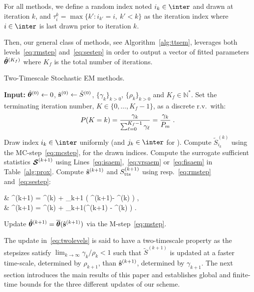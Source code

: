 \documentclass[12pt]{article}
\begin{document}
\medskip
{} For all methods, we define a random index noted $i_k \in \inter$ and drawn at iteration $k$, and $\tau_i^k = \max \{ k' : i_{k'} = i,~k' < k \}$ as the iteration index where $i \in \inter$ is last drawn prior to iteration $k$.



Then, our general class of methods, see Algorithm~\ref{alg:ttsem}, leverages both levels~\eqref{eq:rmstep} and~\eqref{eq:sestep} in order to output a vector of fitted parameters $\hat{{\bm{\theta}}}^{({ K}_{ f })}$ where ${ K}_{ f }$ is the total number of iterations.
\begin{algorithm}[t]
\caption{Two-Timescale Stochastic EM methods.}\label{alg:ttsem}
  \begin{algorithmic}[1]
  \STATE \textbf{Input:} $\hat{{\bm{\theta}}}^{(0)} \leftarrow 0$, $\hat{{\mathbf{s}}}^{(0)} \leftarrow \tilde{S}^{(0)}$, $\{\gamma_k\}_{k>0}$, $\{\rho_k\}_{k>0}$ and $ { K}_{ f }\in \mathbb{N}^*$.
  \STATE Set the terminating iteration number, $K \in \{0,\dots,{ K}_{ f }-1\}$, as a discrete r.v.~with:
  \begin{equation} \label{eq:random}
   P( K = k ) = \frac{ \gamma_{k} }{\sum_{\ell=0}^{{ K}_{ f }-1} \gamma_\ell} = \frac{\gamma_k}{{ P}_{ m}}\;.
  \end{equation}
  \STATE Draw index $i_k \in \inter$ uniformly (and $j_k \in \inter$ for \FISAEM).
     \STATE Compute $\tilde{S}_{i_k}^{(k)}$ using the { MC-step}~\eqref{eq:mcstep},  for the drawn indices.
   \STATE Compute the surrogate sufficient statistics ${\bm{\mathcal{S}}}^{(k+1)}$ using Lines~\ref{eq:isaem},~\ref{eq:vrsaem} or~\ref{eq:fisaem} in Table~\ref{alg:prox}.
   \STATE Compute $\hat{{\mathbf{s}}}^{(k+1)}$ and $S_{\textrm{tts}}^{(k+1)}$ using resp.~\eqref{eq:rmstep} and~\eqref{eq:sestep}:
\beq \label{eq:twolevels}
\begin{split}
& \stt^{(k+1)} = \stt^{(k)} + \rho_{k+1} ( \StocEstep^{(k+1)}- \stt^{(k)}  ) \eqs,\\
&  \hat{\bss}^{(k+1)} =  \hat{\bss}^{(k)}  + \gamma_{k+1}(\stt^{(k+1)} - \hat{\bss}^{(k)} ) \eqs.
\end{split}
\eeq
 \STATE Update $\hat{{\bm{\theta}}}^{(k+1)} = \overline{{\bm{\theta}}}(  \hat{{\mathbf{s}}}^{(k+1)}) $ via the M-step~\eqref{eq:mstep}.
\ENDFOR
  \end{algorithmic}
\end{algorithm}
The update in~\eqref{eq:twolevels} is said to have a {two-timescale} property as the stepsizes satisfy $\lim_{k \to \infty} \gamma_k/\rho_k < 1$ such that $ \tilde{S}^{(k+1)} $  is updated at a faster time-scale, determined by $\rho_{k+1}$, than $\hat{{\mathbf{s}}}^{(k+1)}$, determined by $\gamma_{k+1}$.
The next section introduces the main results of this paper and establishes global and finite-time bounds for the three different updates of our scheme. 
\end{document}
